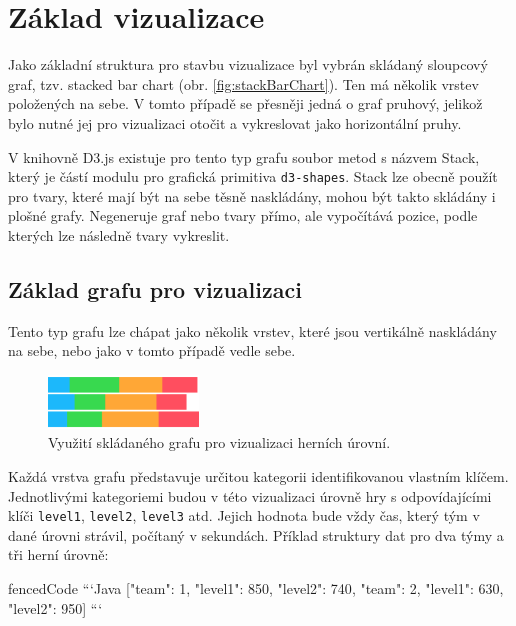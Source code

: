 \documentclass[
  digital, %
  oneside, %
  table,   %
  nolof,     %
  nolot,     %
]{fithesis3}
\begin{document}
\section{Základ vizualizace}
Jako základní struktura pro stavbu vizualizace byl vybrán skládaný sloupcový graf, tzv. stacked bar chart (obr. \ref{fig:stackBarChart}). Ten má několik vrstev položených na sebe. V tomto případě se přesněji jedná o graf pruhový, jelikož bylo nutné jej pro vizualizaci otočit a vykreslovat jako horizontální pruhy.\par
V knihovně D3.js existuje pro tento typ grafu soubor metod s názvem Stack, který je částí modulu pro grafická primitiva \verb|d3-shapes|. Stack lze obecně použít pro tvary, které mají být na sebe těsně naskládány, mohou být takto skládány i plošné grafy. Negeneruje graf nebo tvary přímo, ale vypočítává pozice, podle kterých lze následně tvary vykreslit. \cite{d3jsorg}\par

\subsection{Základ grafu pro vizualizaci} \label{chartBase}
Tento typ grafu lze chápat jako několik vrstev, které jsou vertikálně naskládány na sebe, nebo jako v tomto případě vedle sebe.
\begin{figure}[H]
  \begin{center}
    \includegraphics[width=4cm]{images/stack-ctf.pdf}
  \end{center}
  \caption{Využití skládaného grafu pro vizualizaci herních úrovní.}
  \label{fig:visualizationChart}
\end{figure}
Každá vrstva grafu představuje určitou kategorii identifikovanou vlastním klíčem. Jednotlivými kategoriemi budou v této vizualizaci úrovně hry s odpovídajícími klíči \verb|level1|, \verb|level2|, \verb|level3| atd. Jejich hodnota bude vždy čas, který tým v dané úrovni strávil, počítaný v sekundách. Příklad struktury dat pro dva týmy a tři herní úrovně:
\begin{markdown*}{
  fencedCode
}
```Java
	[{"team": 1, "level1": 850, "level2": 740},
	 {"team": 2, "level1": 630, "level2": 950}]
```
\end{markdown*}
\end{document}
